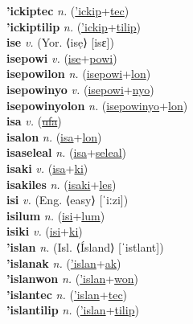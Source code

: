 \textbf{'ickiptec} \textit{n.} (\hyperref['ickip]{'ickip}+\hyperref[tec]{tec})
 \label{'ickiptec} \\
\textbf{'ickiptilip} \textit{n.} (\hyperref['ickip]{'ickip}+\hyperref[tilip]{tilip})
 \label{'ickiptilip} \\
\textbf{ise} \textit{v.} (Yor. ⟨isẹ⟩ [isɛ])
 \label{ise} \\
\textbf{isepowi} \textit{v.} (\hyperref[ise]{ise}+\hyperref[powi]{powi})
 \label{isepowi} \\
\textbf{isepowilon} \textit{n.} (\hyperref[isepowi]{isepowi}+\hyperref[lon]{lon})
 \label{isepowilon} \\
\textbf{isepowinyo} \textit{v.} (\hyperref[isepowi]{isepowi}+\hyperref[nyo]{nyo})
 \label{isepowinyo} \\
\textbf{isepowinyolon} \textit{n.} (\hyperref[isepowinyo]{isepowinyo}+\hyperref[lon]{lon})
 \label{isepowinyolon} \\
\textbf{isa} \textit{v.} (\hyperref[ufa]{\sout{ufa}})
 \label{isa} \\
\textbf{isalon} \textit{n.} (\hyperref[isa]{isa}+\hyperref[lon]{lon})
 \label{isalon} \\
\textbf{isaseleal} \textit{n.} (\hyperref[isa]{isa}+\hyperref[seleal]{seleal})
 \label{isaseleal} \\
\textbf{isaki} \textit{v.} (\hyperref[isa]{isa}+\hyperref[ki]{ki})
 \label{isaki} \\
\textbf{isakiles} \textit{n.} (\hyperref[isaki]{isaki}+\hyperref[les]{les})
 \label{isakiles} \\
\textbf{isi} \textit{v.} (Eng. ⟨easy⟩ [ˈiːzi])
 \label{isi} \\
\textbf{isilum} \textit{n.} (\hyperref[isi]{isi}+\hyperref[lum]{lum})
 \label{isilum} \\
\textbf{isiki} \textit{v.} (\hyperref[isi]{isi}+\hyperref[ki]{ki})
 \label{isiki} \\
\textbf{'islan} \textit{n.} (Isl. ⟨Ísland⟩ [ˈistlant])
 \label{'islan} \\
\textbf{'islanak} \textit{n.} (\hyperref['islan]{'islan}+\hyperref[ak]{ak})
 \label{'islanak} \\
\textbf{'islanwon} \textit{n.} (\hyperref['islan]{'islan}+\hyperref[won]{won})
 \label{'islanwon} \\
\textbf{'islantec} \textit{n.} (\hyperref['islan]{'islan}+\hyperref[tec]{tec})
 \label{'islantec} \\
\textbf{'islantilip} \textit{n.} (\hyperref['islan]{'islan}+\hyperref[tilip]{tilip})
 \label{'islantilip} \\
